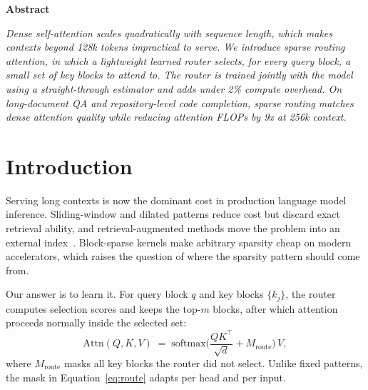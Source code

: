 \documentclass[10pt,twocolumn]{article}
\begin{document}

\begin{center}{\bfseries Abstract}\end{center}
\noindent\textit{Dense self-attention scales quadratically with sequence
length, which makes contexts beyond 128k tokens impractical to serve. We
introduce sparse routing attention, in which a lightweight learned router
selects, for every query block, a small set of key blocks to attend to. The
router is trained jointly with the model using a straight-through estimator
and adds under 2\% compute overhead. On long-document QA and repository-level
code completion, sparse routing matches dense attention quality while reducing
attention FLOPs by 9x at 256k context.}

\section{Introduction}
Serving long contexts is now the dominant cost in production language model
inference. Sliding-window and dilated patterns reduce cost but discard exact
retrieval ability, and retrieval-augmented methods move the problem into an
external index~\cite{fontaine2024window}. Block-sparse kernels make arbitrary
sparsity cheap on modern accelerators, which raises the question of where the
sparsity pattern should come from.

Our answer is to learn it. For query block $q$ and key blocks $\{k_j\}$, the
router computes selection scores and keeps the top-$m$ blocks, after which
attention proceeds normally inside the selected set:
\begin{equation}
  \mathrm{Attn}(Q, K, V) \;=\; \mathrm{softmax}\!\Big(\frac{Q K^{\top}}{\sqrt{d}} + M_{\mathrm{route}}\Big)\, V,
  \label{eq:route}
\end{equation}
where $M_{\mathrm{route}}$ masks all key blocks the router did not select.
Unlike fixed patterns, the mask in Equation~\eqref{eq:route} adapts per head
and per input.
\end{document}
